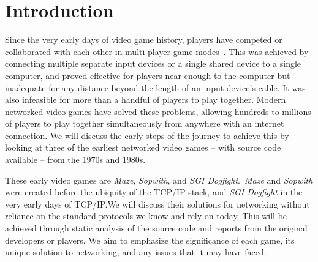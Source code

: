 \section{Introduction}\label{sec:intro}


Since the very early days of video game history, players have competed or collaborated with each other in multi-player game modes~\cite{bnlfirst}. This was achieved by connecting multiple separate input devices or a single shared device to a single computer, and proved effective for players near enough to the computer but inadequate for any distance beyond the length of an input device's cable. It was also infeasible for more than a handful of players to play together. Modern networked video games have solved these problems, allowing hundreds to millions of players to play together simultaneously from anywhere with an internet connection. We will discuss the early steps of the journey to achieve this by looking at three of the earliest networked video games -- with source code available -- from the 1970s and 1980s.

These early video games are \textit{Maze}, \textit{Sopwith}, and \textit{SGI Dogfight}.\ \textit{Maze} and \textit{Sopwith} were created before the ubiquity of the TCP/IP stack, and \textit{SGI Dogfight} in the very early days of TCP/IP.\@ We will discuss their solutions for networking without reliance on the standard protocols we know and rely on today. This will be achieved through static analysis of the source code and reports from the original developers or players. We aim to emphasize the significance of each game, its unique solution to networking, and any issues that it may have faced.
